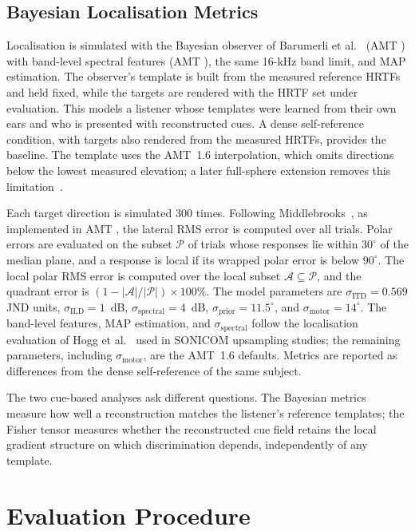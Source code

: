 \documentclass[journal]{IEEEtran}
\begin{document}
\subsection{Bayesian Localisation Metrics}\label{sec:bayes}
Localisation is simulated with the Bayesian observer of Barumerli et al.~\cite{Barumerli2023} (AMT ) with band-level spectral features (AMT ), the same 16-kHz band limit, and MAP estimation. The observer's template is built from the measured reference HRTFs and held fixed, while the targets are rendered with the HRTF set under evaluation. This models a listener whose templates were learned from their own ears and who is presented with reconstructed cues. A dense self-reference condition, with targets also rendered from the measured HRTFs, provides the baseline. The template uses the AMT~1.6 interpolation, which omits directions below the lowest measured elevation; a later full-sphere extension removes this limitation~\cite{Barumerli2026}.

Each target direction is simulated 300 times. Following Middlebrooks~\cite{Middlebrooks1999}, as implemented in AMT , the lateral RMS error is computed over all trials. Polar errors are evaluated on the subset \(\mathcal P\) of trials whose responses lie within \(30^\circ\) of the median plane, and a response is local if its wrapped polar error is below \(90^\circ\). The local polar RMS error is computed over the local subset \(\mathcal A\subseteq\mathcal P\), and the quadrant error is \((1-|\mathcal A|/|\mathcal P|)\times100\%\). The model parameters are \(\sigma_{\mathrm{ITD}}=0.569\) JND units, \(\sigma_{\mathrm{ILD}}=1\)~dB, \(\sigma_{\mathrm{spectral}}=4\)~dB, \(\sigma_{\mathrm{prior}}=11.5^\circ\), and \(\sigma_{\mathrm{motor}}=14^\circ\). The band-level features, MAP estimation, and \(\sigma_{\mathrm{spectral}}\) follow the localisation evaluation of Hogg et al.~\cite{Hogg2024GAN} used in SONICOM upsampling studies; the remaining parameters, including \(\sigma_{\mathrm{motor}}\), are the AMT~1.6 defaults. Metrics are reported as differences from the dense self-reference of the same subject.

The two cue-based analyses ask different questions. The Bayesian metrics measure how well a reconstruction matches the listener's reference templates; the Fisher tensor measures whether the reconstructed cue field retains the local gradient structure on which discrimination depends, independently of any template.

\section{Evaluation Procedure}
\end{document}
